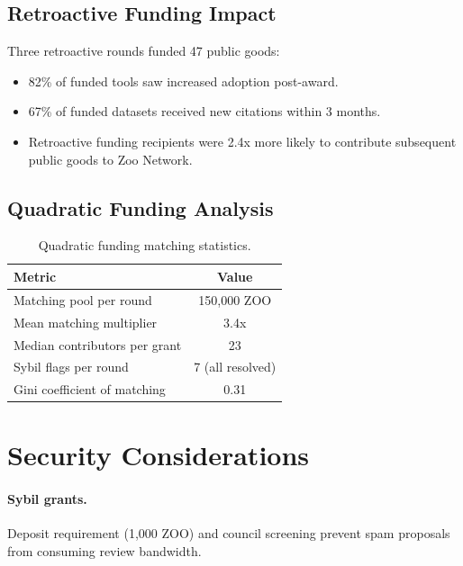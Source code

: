 \documentclass[11pt,letterpaper]{article}
\begin{document}
\subsection{Retroactive Funding Impact}

Three retroactive rounds funded 47 public goods:
\begin{itemize}
    \item 82\% of funded tools saw increased adoption post-award.
    \item 67\% of funded datasets received new citations within 3 months.
    \item Retroactive funding recipients were 2.4x more likely to contribute subsequent public goods to Zoo Network.
\end{itemize}

\subsection{Quadratic Funding Analysis}

\begin{table}[h]
\centering
\caption{Quadratic funding matching statistics.}
\label{tab:qf}
\begin{tabular}{lc}
\toprule
\textbf{Metric} & \textbf{Value} \\
\midrule
Matching pool per round & 150{,}000 ZOO \\
Mean matching multiplier & 3.4x \\
Median contributors per grant & 23 \\
Sybil flags per round & 7 (all resolved) \\
Gini coefficient of matching & 0.31 \\
\bottomrule
\end{tabular}
\end{table}

\section{Security Considerations}
\label{sec:security}

\paragraph{Sybil grants.} Deposit requirement (1{,}000 ZOO) and council screening prevent spam proposals from consuming review bandwidth.
\end{document}
